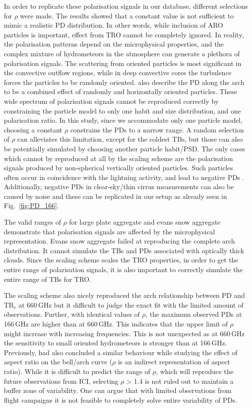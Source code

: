 \documentclass[amt, manuscript]{copernicus}
\begin{document}
In order to replicate these polarisation signals in our database,  different selections for $\rho$ were made. The results showed that a constant value is not sufficient to mimic a realistic PD distribution. In other words, while inclusion of ARO particles is important, effect from TRO cannot be completely ignored. In reality, the polarisation patterns depend on the microphysical properties, and the complex mixture of hydrometeors in the atmosphere can generate a plethora of polarisation signals. The scattering from oriented particles is most significant in the convective outflow regions, while in deep convective cores the turbulence forces the particles to be randomly oriented. \citet{gong:micro:17} also describe the PD along the arch to be a combined effect of randomly and horizontally oriented particles. These wide spectrum of polarisation signals cannot be reproduced correctly by constraining the particle model to only one habit and size distribution, and one polarisation ratio. In this study, since we accommodate only one particle model, choosing a constant $\rho$ constrains the PDs to a narrow range. A random selection of $\rho$ can alleviates this limitation, except for the coldest TBs, but those can also be potentially simulated by choosing another particle habit/PSD. The only cases which cannot by reproduced at all by the scaling scheme are the polarisation signals produced by non-spherical vertically oriented particles. Such particles often occur in coincidence with the lightning activity, and lead to negative PDs \citep{prigent:relat:05}. Additionally, negative PDs in clear-sky/thin cirrus measurements can also be caused by noise and these can be replicated in our setup as already seen in Fig.~\ref{fig:PD_166}.  

The valid ranges of $\rho$ for large plate aggregate and evans snow aggregate demonstrate that polarisation signals are affected by the microphysical representation. Evans snow aggregate failed at reproducing the complete arch distribution. It cannot simulate the TBs and PDs associated with optically thick clouds. Since the scaling scheme scales the TRO properties, in order to get the entire range of polarisation signals, it is also important to correctly simulate the  entire range of TBs for TRO.

The scaling scheme also nicely reproduced the arch relationship between PD and TB$_v$ at 660\,GHz but it difficult to judge the exact fit with the limited amount of observations. Further, with identical values of $\rho$, the maximum observed PDs at 166\,GHz are higher than at 660\,GHz. This indicates that the upper limit of $\rho$ might increase with increasing frequencies. This is not unexpected as at 660\,GHz the sensitivity to small oriented hydrometeors is stronger than at 166\,GHz. Previously, \citet{gong:micro:17} had also concluded a similar behaviour while studying the effect of aspect ratio on the bell/arch curve ($\rho$ is an indirect representation of aspect ratio). While it is difficult to predict the range of $\rho$, which will reproduce the future observations from ICI, selecting $\rho$ > 1.4 is not ruled out to maintain a buffer zone of variability. One can argue that with limited observations from flight campaigns it is not feasible to completely solve entire variability of PDs. 
\end{document}
